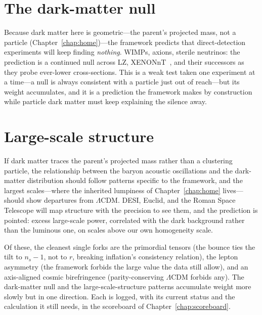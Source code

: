 \section{The dark-matter null}

Because dark matter here is geometric---the parent's projected mass, not a
particle (Chapter~\ref{chap:home})---the framework predicts that direct-detection
experiments will keep finding \emph{nothing}. WIMPs, axions, sterile neutrinos:
the prediction is a continued null across LZ, XENONnT~\citep{aprile2023}, and
their successors as
they probe ever-lower cross-sections. This is a weak test taken one experiment at a
time---a null is always consistent with a particle just out of reach---but its
weight accumulates, and it is a prediction the framework makes by construction
while particle dark matter must keep explaining the silence away.

\section{Large-scale structure}

If dark matter traces the parent's projected mass rather than a clustering
particle, the relationship between the baryon acoustic oscillations and the
dark-matter distribution should follow patterns specific to the framework, and the
largest scales---where the inherited lumpiness of Chapter~\ref{chap:home} lives---
should show departures from $\Lambda$CDM. DESI, Euclid, and the Roman Space
Telescope will map structure with the precision to see them, and the prediction is
pointed: excess large-scale power, correlated with the dark background rather than
the luminous one, on scales above our own homogeneity scale.

\medskip
\noindent Of these, the cleanest single forks are the primordial tensors (the
bounce ties the tilt to $n_s-1$, not to $r$, breaking inflation's consistency
relation), the lepton asymmetry (the framework
forbids the large value the data still allow), and an axis-aligned cosmic
birefringence (parity-conserving $\Lambda$CDM forbids any). The dark-matter null and the
large-scale-structure patterns accumulate weight more slowly but in one
direction. Each is logged, with its current status and the calculation it still
needs, in the scoreboard of Chapter~\ref{chap:scoreboard}.
